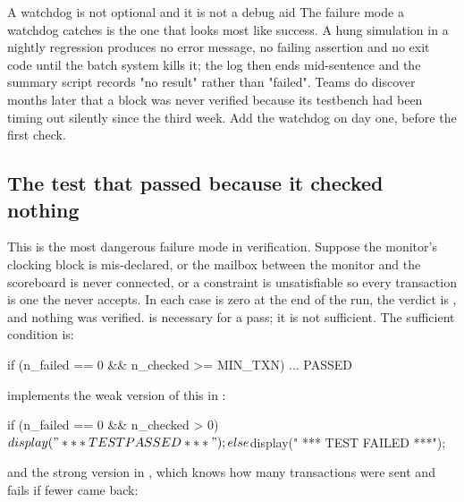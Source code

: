 \begin{gotcha}{A watchdog is not optional and it is not a debug aid}
The failure mode a watchdog catches is the one that looks most like success. A
hung simulation in a nightly regression produces no error message, no failing
assertion and no exit code until the batch system kills it; the log then ends
mid-sentence and the summary script records "no result" rather than "failed".
Teams do discover months later that a block was never verified because its
testbench had been timing out silently since the third week. Add the watchdog
on day one, before the first check.
\end{gotcha}

\subsection{The test that passed because it checked nothing}
\label{sec:tb:nocheck}

This is the most dangerous failure mode in verification. Suppose the monitor's
clocking block is mis-declared, or the mailbox between the monitor and the
scoreboard is never connected, or a constraint is unsatisfiable so every
transaction is one the \DUT{} never accepts. In each case  is
zero at the end of the run, the verdict is , and nothing was
verified.  is necessary for a pass; it is not sufficient.
The sufficient condition is:

\begin{svcode}
if (n_failed == 0 && n_checked >= MIN_TXN) ... PASSED
\end{svcode}

 implements the weak version of this in
:

\begin{svcode}
if (n_failed == 0 && n_checked > 0) $display(" *** TEST PASSED ***");
else                                $display(" *** TEST FAILED ***");
\end{svcode}

and the strong version in , which knows how
many transactions were sent and fails if fewer came back:


